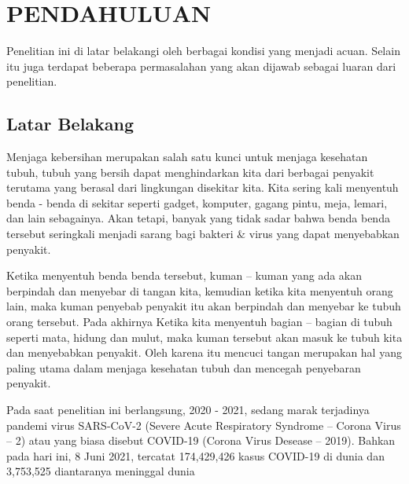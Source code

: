 \chapter{PENDAHULUAN}
\label{chap:pendahuluan}


Penelitian ini di latar belakangi oleh berbagai kondisi yang menjadi acuan. Selain itu juga terdapat beberapa permasalahan yang akan dijawab sebagai luaran dari penelitian.

\section{Latar Belakang}
\label{sec:latarbelakang}

Menjaga kebersihan merupakan salah satu kunci untuk menjaga kesehatan tubuh, tubuh yang bersih dapat menghindarkan kita dari berbagai penyakit terutama yang berasal dari lingkungan disekitar kita. Kita sering kali menyentuh benda - benda di sekitar seperti gadget, komputer, gagang pintu, meja, lemari, dan lain sebagainya. Akan tetapi, banyak yang tidak sadar bahwa benda benda tersebut seringkali menjadi sarang bagi bakteri \& virus yang dapat menyebabkan penyakit. 

Ketika menyentuh benda benda tersebut, kuman – kuman yang ada akan berpindah dan menyebar di tangan kita, kemudian ketika kita menyentuh orang lain, maka kuman penyebab penyakit itu akan berpindah dan menyebar ke tubuh orang tersebut. Pada akhirnya Ketika kita menyentuh bagian – bagian di tubuh seperti mata, hidung dan mulut, maka kuman tersebut akan masuk ke tubuh kita dan menyebabkan penyakit. Oleh karena itu mencuci tangan merupakan hal yang paling utama dalam menjaga kesehatan tubuh dan mencegah penyebaran penyakit.

Pada saat penelitian ini berlangsung, 2020 - 2021, sedang marak terjadinya pandemi virus SARS-CoV-2 (Severe Acute Respiratory Syndrome – Corona Virus – 2) atau yang biasa disebut COVID-19 (Corona Virus Desease – 2019)\cite{cit:copid}. Bahkan pada hari ini, 8 Juni 2021, tercatat 174,429,426 kasus COVID-19 di dunia dan 3,753,525 diantaranya meninggal dunia \cite{cit:covidcase}

